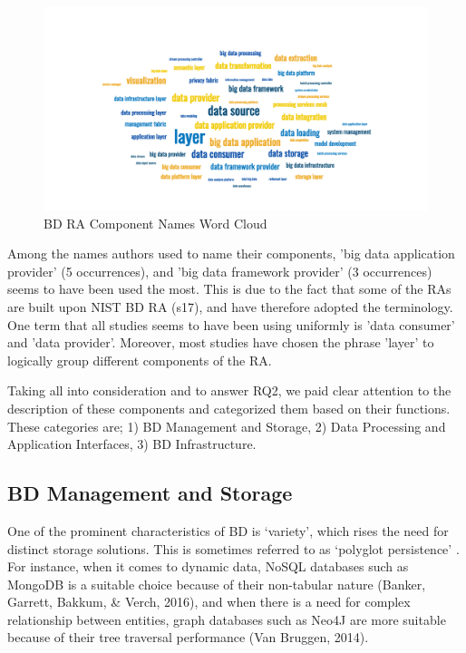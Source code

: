 \documentclass{ieeeaccess}
\begin{document}
\begin{figure}[h]
    \includegraphics[width=18cm]{wordcloud.png}
    \caption{BD RA Component Names Word Cloud}
    \label{image:word-cloud}
\end{figure}

Among the names authors used to name their components, 'big data application provider' (5 occurrences), and 'big data framework provider' (3 occurrences) seems to have been used the most. This is due to the fact that some of the RAs are built upon NIST BD RA (s17), and have therefore adopted the terminology. One term that all studies seems to have been using uniformly is 'data consumer' and 'data provider'. Moreover, most studies have chosen the phrase 'layer' to logically group different components of the RA.

Taking all into consideration and to answer RQ2, we paid clear attention to the description of these components and categorized them based on their functions. These categories are; 1) BD Management and Storage, 2) Data Processing and Application Interfaces, 3) BD Infrastructure.

\subsection{BD Management and Storage}

One of the prominent characteristics of BD is ‘variety’, which rises the need for distinct storage solutions. This is sometimes referred to as ‘polyglot persistence’ \cite{khine2019review}. For instance, when it comes to dynamic data, NoSQL databases such as MongoDB is a suitable choice because of their non-tabular nature (Banker, Garrett, Bakkum, \& Verch, 2016), and when there is a need for complex relationship between entities, graph databases such as Neo4J are more suitable because of their tree traversal performance (Van Bruggen, 2014). 
 
\end{document}
